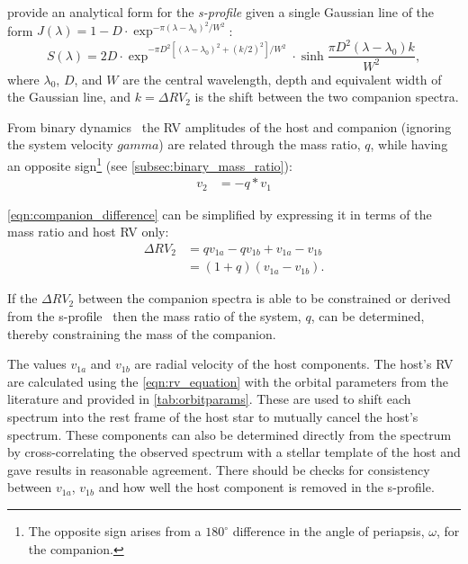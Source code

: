 \citet{ferluga_separating_1997} provide an analytical form for the \emph{s-profile} given a single Gaussian line of the form
$J(\lambda) = 1- D \cdot\exp^{{-\pi {(\lambda - \lambda_0)}^2} / {{W}^{2}}}$:
\begin{equation}
    S(\lambda) = 2 D\cdot\exp^{{-\pi {D}^{2} [{(\lambda - \lambda_0)}^{2} +{(k/2)}^{2}]}/{{W}^{2}}} \cdot \sinh{\frac{\pi {D}^{2}(\lambda-\lambda_0)k}{{W}^{2}}},\label{eqn:sprofile_gaussain}
\end{equation}
where $\lambda_0$, \(D\), and \(W\) are the central wavelength, depth and equivalent width of the Gaussian line, and $k=\Delta {RV}_2 $ is the shift between the two companion spectra.

From binary dynamics~\citep[e.g.][]{murray_keplerian_2010} the {RV} amplitudes of the host and companion (ignoring the system velocity $gamma$) are related through the mass ratio, \(q\), while having an opposite sign\footnote{The opposite sign arises from a \(180^\circ\) difference in the angle of periapsis, \(\omega\), for the companion.} (see \cref{subsec:binary_mass_ratio}):
\begin{align}
v_{2} &= -q * v_{1} \label{eqn:q_relation}
\end{align}

\cref{eqn:companion_difference} can be simplified by expressing it in terms of the mass ratio and host {RV} only:
\begin{align}
\Delta {RV}_{2} &= q v_{1a} - q v_{1b} + v_{1a} - v_{1b} \nonumber \\
&= (1 + q)(v_{1a} - v_{1b}).\label{eqn:companion_difference_simplified}
\end{align}

If the \(\Delta {RV}_2\) between the companion spectra is able to be constrained or derived from the s-profile~\citep[see][]{ferluga_separating_1997} then the mass ratio of the system, \(q\), can be determined, thereby constraining the mass of the companion.

The values \(v_{1a}\) and \(v_{1b}\) are radial velocity of the host components.
The host's {RV} are calculated using the \cref{eqn:rv_equation} with the orbital parameters from the literature and provided in \cref{tab:orbitparams}.
These are used to shift each spectrum into the rest frame of the host star to mutually cancel the host's spectrum.
These components can also be determined directly from the spectrum by cross-correlating the observed spectrum with a stellar template of the host and gave results in reasonable agreement.
There should be checks for consistency between \(v_{1a}\), \(v_{1b}\) and how well the host component is removed in the s-profile.

